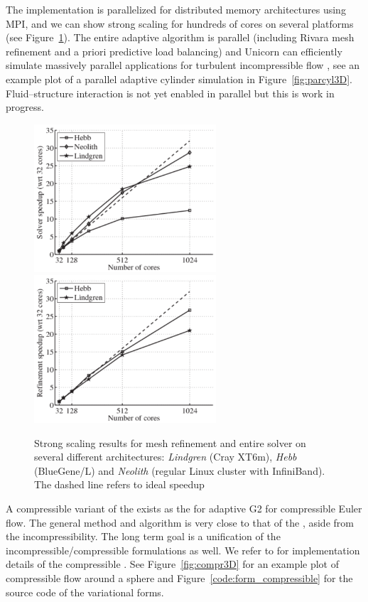 The  implementation is parallelized for distributed
memory architectures using MPI, and we can show strong scaling for
hundreds of cores on several platforms (see
Figure~\ref{fig:hoffman-2:sp}). The entire adaptive algorithm is
parallel (including Rivara mesh refinement and a priori predictive
load balancing) and Unicorn can efficiently simulate massively
parallel applications for turbulent incompressible
flow \citep{JanssonHoffmanJansson2010, Jansson2011}, see an example
plot of a parallel adaptive cylinder simulation in
Figure~\ref{fig:parcyl3D}. Fluid--structure interaction is not yet
enabled in parallel but this is work in progress.

\begin{figure}
\centering
\includegraphics[height=5.5cm]{chapters/hoffman-2/pdf/speedup_solve.pdf}
\includegraphics[height=5.5cm]{chapters/hoffman-2/pdf/speedup_unrivara.pdf}
\caption{\label{fig:hoffman-2:sp} Strong scaling results for mesh
refinement and entire solver on several different architectures:
\textit{Lindgren} (Cray XT6m), \textit{Hebb} (BlueGene/L) and
\textit{Neolith} (regular Linux cluster with InfiniBand). The dashed
line refers to ideal speedup}
\end{figure}

A compressible variant of the  exists as
the  for adaptive G2 for compressible Euler flow. The
general method and algorithm is very close to that of
the , aside from the incompressibility. The long term
goal is a unification of the incompressible/compressible formulations
as well. We refer to \citet{Nazarov2009} for implementation details of
the compressible
. See Figure~\ref{fig:compr3D} for an example plot of compressible flow around a
sphere and Figure~\ref{code:form_compressible} for the source code of
the variational forms.

